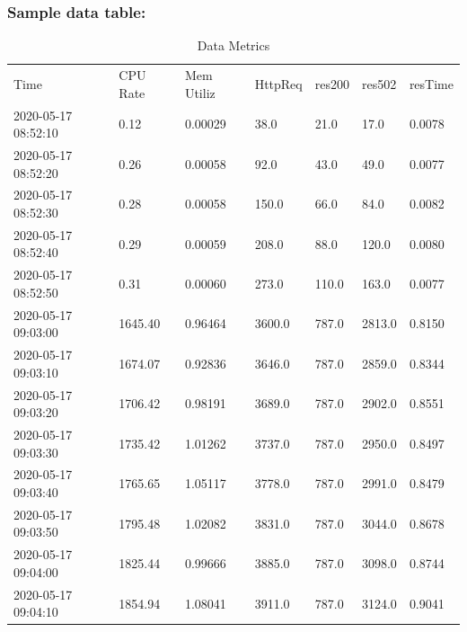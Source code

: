 \subsubsection{Sample data table:}
\begin{table}[htpb]
  \caption[Data table]{Data Metrics}\label{tab:sample}
    \begin{tabular}{lllllll}
    Time               & CPU Rate              & Mem Utiliz    & HttpReq & res200 & res502 & resTime              \\
    2020-05-17 08:52:10 & 0.12                & 0.00029 & 38.0      & 21.0        & 17.0        & 0.0078         \\
    2020-05-17 08:52:20 & 0.26                & 0.00058 & 92.0     & 43.0        & 49.0        & 0.0077 \\
    2020-05-17 08:52:30 & 0.28                & 0.00058 & 150.0     & 66.0        & 84.0        & 0.0082 \\
    2020-05-17 08:52:40 & 0.29 & 0.00059 & 208.0     & 88.0        & 120.0       & 0.0080 \\
    2020-05-17 08:52:50 & 0.31                & 0.00060 & 273.0     & 110.0       & 163.0       & 0.0077 \\
    2020-05-17 09:03:00 & 1645.40  & 0.96464    & 3600.0     & 787.0       & 2813.0      & 0.8150   \\
    2020-05-17 09:03:10 & 1674.07  & 0.92836    & 3646.0     & 787.0       & 2859.0      & 0.8344   \\
    2020-05-17 09:03:20 & 1706.42  & 0.98191    & 3689.0     & 787.0       & 2902.0      & 0.8551   \\
    2020-05-17 09:03:30 & 1735.42             & 1.01262     & 3737.0     & 787.0       & 2950.0      & 0.8497         \\
    2020-05-17 09:03:40 & 1765.65  & 1.05117     & 3778.0     & 787.0       & 2991.0      & 0.8479   \\
    2020-05-17 09:03:50 & 1795.48             & 1.02082    & 3831.0     & 787.0       & 3044.0      & 0.8678   \\
    2020-05-17 09:04:00 & 1825.44             & 0.99666    & 3885.0     & 787.0       & 3098.0      & 0.8744   \\
    2020-05-17 09:04:10 & 1854.94  & 1.08041    & 3911.0     & 787.0       & 3124.0      & 0.9041  
    \end{tabular}
\end{table}
































